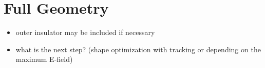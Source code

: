 \section{Full Geometry}
\begin{itemize}
  \item outer insulator may be included if necessary
  \item what is the next step? (shape optimization with tracking or depending on the maximum E-field)
\end{itemize}

\begin{center}
\begin{figure}[h]
  
\end{figure}
\end{center}

\begin{center}
\begin{figure}
  
\end{figure}
\end{center}

\begin{center}
\begin{figure}
  
\end{figure}
\end{center}

\begin{figure}
  \hspace{-2.5cm}
  
\end{figure}
\newpage
